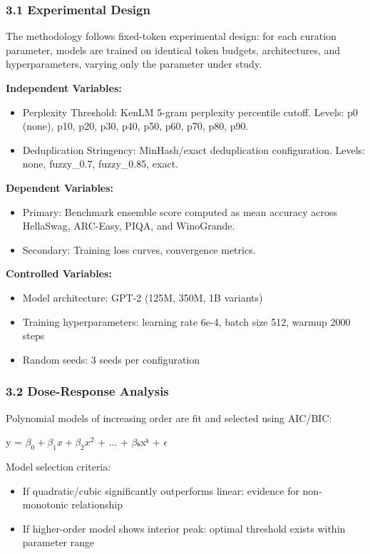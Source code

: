 
\subsubsection{3.1 Experimental Design}

The methodology follows fixed-token experimental design: for each curation parameter, models are trained on identical token budgets, architectures, and hyperparameters, varying only the parameter under study.

\textbf{Independent Variables:}

\begin{itemize}
\item Perplexity Threshold: KenLM 5-gram perplexity percentile cutoff. Levels: p0 (none), p10, p20, p30, p40, p50, p60, p70, p80, p90.
\item Deduplication Stringency: MinHash/exact deduplication configuration. Levels: none, fuzzy\_0.7, fuzzy\_0.85, exact.
\end{itemize}

\textbf{Dependent Variables:}

\begin{itemize}
\item Primary: Benchmark ensemble score computed as mean accuracy across HellaSwag, ARC-Easy, PIQA, and WinoGrande.
\item Secondary: Training loss curves, convergence metrics.
\end{itemize}

\textbf{Controlled Variables:}

\begin{itemize}
\item Model architecture: GPT-2 (125M, 350M, 1B variants)
\item Training hyperparameters: learning rate 6e-4, batch size 512, warmup 2000 steps
\item Random seeds: 3 seeds per configuration
\end{itemize}

\subsubsection{3.2 Dose-Response Analysis}

Polynomial models of increasing order are fit and selected using AIC/BIC:

y = $\beta _0 + \beta _1x + \beta _2x^2$ + ... + $\beta$ₖxᵏ + $\epsilon$

Model selection criteria:
\begin{itemize}
\item If quadratic/cubic significantly outperforms linear: evidence for non-monotonic relationship
\item If higher-order model shows interior peak: optimal threshold exists within parameter range
\end{itemize}

